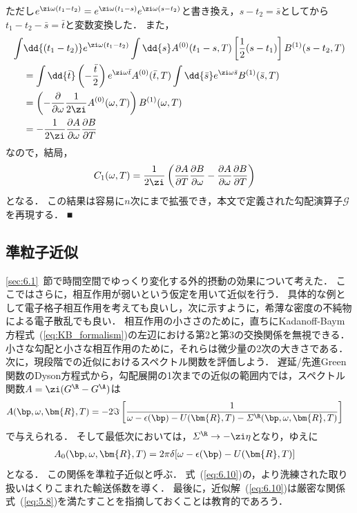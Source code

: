 \documentclass[a4paper,10pt]{jsarticle}
\begin{document}
ただし$e^{\zi \omega (t_1 - t_2)} = e^{\zi \omega (t_1 - s)} e^{\zi \omega (s - t_2)}$と書き換え，$s - t_2 = \bar{s}$としてから$t_1 - t_2 - \bar{s} = \bar{t}$と変数変換した．
また，
\begin{align*}
\int & \dd{(t_1 - t_2)} e^{\zi \omega (t_1 - t_2)}
		\int \dd{s} A^{(0)} (t_1 - s, T) \left[ \frac{1}{2} (s - t_1) \right] B^{(1)} (s - t_2, T)
\\	& = \int \dd{\bar{t}} \left( - \frac{\bar{t}}{2} \right) e^{\zi \omega \bar{t}} A^{(0)} (\bar{t}, T) \int \dd{\bar{s}} e^{\zi \omega \bar{s}} B^{(1)} (\bar{s}, T)
\\
	& = \left( - \frac{\partial}{\partial \omega} \frac{1}{2 \zi} A^{(0)} (\omega, T) \right) B^{(1)} (\omega, T)
\\
	& = - \frac{1}{2 \zi} \frac{\partial A}{\partial \omega} \frac{\partial B}{\partial T}
\end{align*}
なので，結局，
\begin{align}
C_1 (\omega, T)
	& = \frac{1}{2 \zi} \left(
		\frac{\partial A}{\partial T} \frac{\partial B}{\partial \omega}
		- \frac{\partial A}{\partial \omega} \frac{\partial B}{\partial T}
	\right)
\end{align}
となる．
この結果は容易に$n$次にまで拡張でき，本文で定義された勾配演算子$\mathcal{G}$を再現する．
■


\subsection{\label{sec:6.2}準粒子近似}
\ref{sec:6.1}~節で時間空間でゆっくり変化する外的摂動の効果について考えた．
ここではさらに，相互作用が弱いという仮定を用いて近似を行う．
具体的な例として電子格子相互作用を考えても良いし，次に示すように，希薄な密度の不純物による電子散乱でも良い．
相互作用の小ささのために，直ちにKadanoff-Baym方程式~(\ref{eq:KB_formalism})の左辺における第2と第3の交換関係を無視できる．
小さな勾配と小さな相互作用のために，それらは微少量の2次の大きさである．
次に，現段階での近似におけるスペクトル関数を評価しよう．
遅延/先進Green関数のDyson方程式から，勾配展開の1次までの近似の範囲内では，スペクトル関数$A = \zi (G^{\R} - G^{\A})$は
\begin{align}
A (\bp, \omega, \bm{R}, T)
	& = - 2 \Im \left[
		\frac{1}{\omega - \epsilon (\bp) - U (\bm{R}, T) - \varSigma^{\R} (\bp, \omega, \bm{R}, T)}
	\right]
\label{eq:6.10}
\end{align}
で与えられる．
そして最低次においては，$\varSigma^{\R} \to - \zi \eta$となり，ゆえに
\begin{align}
A_0 (\bp, \omega, \bm{R}, T)
	& = 2 \pi \delta [ \omega - \epsilon (\bp) - U (\bm{R}, T) ]
\label{eq:6.11}
\end{align}
となる．
この関係を準粒子近似と呼ぶ．
式~(\ref{eq:6.10})の，より洗練された取り扱いはくりこまれた輸送係数を導く．
最後に，近似解~(\ref{eq:6.10})は厳密な関係式~(\ref{eq:5.8})を満たすことを指摘しておくことは教育的であろう．
\end{document}
